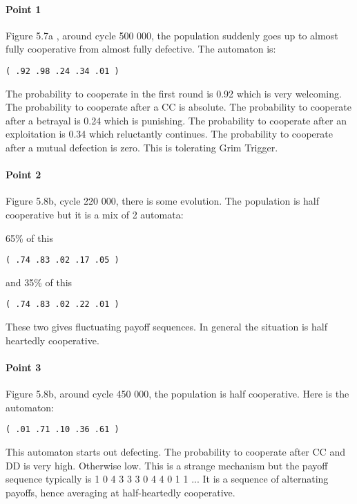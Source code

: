 \documentclass[12.5pt]{report}
\begin{document}
\paragraph{Point 1}
Figure 5.7a , around cycle 500 000, the population suddenly goes up to almost fully cooperative from almost fully defective. The automaton is:

\begin{verbatim}
( .92 .98 .24 .34 .01 ) 
\end{verbatim}

The probability to cooperate in the first round is 0.92 which is very welcoming. The probability to cooperate after a CC is absolute. The probability to cooperate after a betrayal is 0.24 which is punishing. The probability to cooperate after an exploitation is 0.34 which reluctantly continues. The probability to cooperate after a mutual defection is zero. This is tolerating Grim Trigger.

\paragraph{Point 2}
Figure 5.8b, cycle 220 000, there is some evolution. The population is half cooperative but it is a mix of 2 automata:

65\% of this 
\begin{verbatim}
( .74 .83 .02 .17 .05 ) 
\end{verbatim}
and 35\% of this
\begin{verbatim}
( .74 .83 .02 .22 .01 )
\end{verbatim}

These two gives fluctuating payoff sequences. In general the situation is half heartedly cooperative. 

\paragraph{Point 3}
Figure 5.8b, around cycle 450 000, the population is half cooperative. Here is the automaton:

\begin{verbatim}
( .01 .71 .10 .36 .61 )
\end{verbatim}

This automaton starts out defecting. The probability to cooperate after CC and DD is very high. Otherwise low. This is a strange mechanism but the payoff sequence typically is 1 0 4 3 3 3 0 4 4 0 1 1 ... It is a sequence of alternating payoffs, hence averaging at half-heartedly cooperative.
\end{document}
